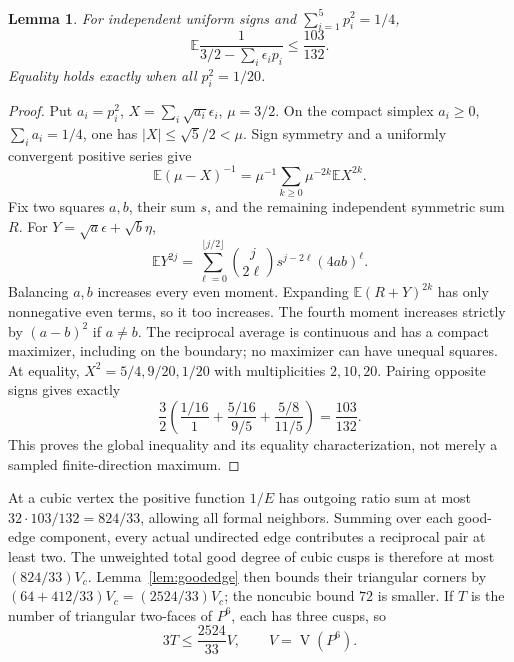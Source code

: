 \documentclass[11pt]{article}
\newtheorem{lemma}[theorem]{Lemma}
\theoremstyle{remark}
\newcommand{\VV}{\operatorname{V}}
\begin{document}
\begin{lemma}\label{lem:reciprocal}
For independent uniform signs and $\sum_{i=1}^5p_i^2=1/4$,
\begin{equation}\label{eq:reciprocal}
 \mathbb E\frac1{3/2-\sum_i\epsilon_i p_i}\le\frac{103}{132}.
\end{equation}
Equality holds exactly when all $p_i^2=1/20$.
\end{lemma}
\begin{proof}
Put $a_i=p_i^2$, $X=\sum_i\sqrt{a_i}\epsilon_i$, $\mu=3/2$.
On the compact simplex $a_i\ge0$, $\sum_i a_i=1/4$, one has
$|X|\le\sqrt5/2<\mu$. Sign symmetry and a uniformly convergent
positive series give
\[
 \mathbb E(\mu-X)^{-1}
 =\mu^{-1}\sum_{k\ge0}\mu^{-2k}\mathbb E X^{2k}.
\]
Fix two squares $a,b$, their sum $s$, and the remaining independent
symmetric sum $R$. For $Y=\sqrt a\epsilon+\sqrt b\eta$,
\[
 \mathbb E Y^{2j}=\sum_{\ell=0}^{\lfloor j/2\rfloor}
 \binom j{2\ell}s^{j-2\ell}(4ab)^\ell.
\]
Balancing $a,b$ increases every even moment. Expanding
$\mathbb E(R+Y)^{2k}$ has only nonnegative even terms, so it too
increases. The fourth moment increases strictly by $(a-b)^2$ if
$a\ne b$. The reciprocal average is continuous and has a compact
maximizer, including on the boundary; no maximizer can have unequal
squares. At equality, $X^2=5/4,9/20,1/20$ with multiplicities $2,10,20$.
Pairing opposite signs gives exactly
\[
 \frac32\left(\frac{1/16}{1}+\frac{5/16}{9/5}
                         +\frac{5/8}{11/5}\right)=\frac{103}{132}.
\]
This proves the global inequality and its equality characterization,
not merely a sampled finite-direction maximum.
\end{proof}

At a cubic vertex the positive function $1/E$ has outgoing ratio sum
at most $32\cdot103/132=824/33$, allowing all formal neighbors.
Summing over each good-edge component, every actual undirected edge
contributes a reciprocal pair at least two. The unweighted total good
degree of cubic cusps is therefore at most $(824/33)V_c$.
Lemma~\ref{lem:goodedge} then bounds their triangular corners by
$(64+412/33)V_c=(2524/33)V_c$; the noncubic bound $72$ is smaller.
If $T$ is the number of triangular two-faces of $P^6$, each has three
cusps, so
\begin{equation}\label{eq:trianglebound}
 3T\le\frac{2524}{33}V,\qquad V=\VV(P^6).
\end{equation}
\end{document}
